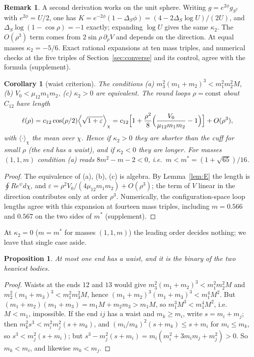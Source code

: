 \documentclass[11pt]{article}
\newtheorem{proposition}[theorem]{Proposition}
\newtheorem{corollary}[theorem]{Corollary}
\theoremstyle{definition}
\newtheorem{remark}[theorem]{Remark}
\begin{document}
\begin{remark}
A second derivation works on the unit sphere. Writing $g=e^{2\phi}g_{S^2}$ with $e^{2\phi}=U/2$, one has
$K=e^{-2\phi}(1-\Delta_S\phi)=(4-2\Delta_S\log U)/(2U)$, and $\Delta_S\log(1-\cos\rho)=-1$ exactly; expanding $\log U$ gives
the same $\kappa_2$. The $O(\rho^3)$ term comes from $2\sin\rho\,\partial_\rho V$ and depends on the direction. At equal
masses $\kappa_2=-5/6$. Exact rational expansions at ten mass triples, and numerical checks at the five triples of
Section~\ref{sec:converse} and its control, agree with the formula (supplement).
\end{remark}

\begin{corollary}[waist criterion]\label{cor:waist}
The conditions (a) $m_3^2(m_1+m_2)^3<m_1^2m_2^2M$, (b) $V_0<\mu_{12}m_1m_2$, (c) $\kappa_2>0$ are equivalent. The round
loops $\rho=\mathrm{const}$ about $C_{12}$ have length
\[
  \ell(\rho)=c_{12}\cos(\rho/2)\Bigl\langle\sqrt{1+\varepsilon}\Bigr\rangle_\chi
  =c_{12}\Bigl[1+\frac{\rho^2}{8}\Bigl(\frac{V_0}{\mu_{12}m_1m_2}-1\Bigr)\Bigr]+O(\rho^3),
\]
with $\langle\cdot\rangle_\chi$ the mean over $\chi$. Hence if $\kappa_2>0$ they are shorter than the cuff for small $\rho$
(the end has a \emph{waist}), and if $\kappa_2<0$ they are longer. For masses $(1,1,m)$ condition (a) reads $8m^2-m-2<0$,
i.e.\ $m<m^*=(1+\sqrt{65})/16$.
\end{corollary}

\begin{proof}
The equivalence of (a), (b), (c) is algebra. By Lemma~\ref{lem:E} the length is $\oint Re^{\psi}d\chi$, and
$\varepsilon=\rho^2V_0/(4\mu_{12}m_1m_2)+O(\rho^3)$; the term of $V$ linear in the direction contributes only at
order $\rho^3$. Numerically, the configuration-space loop lengths agree with this expansion at fourteen mass triples,
including $m=0.566$ and $0.567$ on the two sides of $m^*$ (supplement).
\end{proof}

At $\kappa_2=0$ ($m=m^*$ for masses $(1,1,m)$) the leading order decides nothing; we leave that single case aside.

\begin{proposition}\label{prop:one}
At most one end has a waist, and it is the binary of the two heaviest bodies.
\end{proposition}

\begin{proof}
Waists at the ends $12$ and $13$ would give $m_3^2(m_1+m_2)^3<m_1^2m_2^2M$ and $m_2^2(m_1+m_3)^3<m_1^2m_3^2M$, hence
$(m_1+m_2)^3(m_1+m_3)^3<m_1^4M^2$. But $(m_1+m_2)(m_1+m_3)=m_1M+m_2m_3>m_1M$, so $m_1^3M^3<m_1^4M^2$, i.e.\ $M<m_1$,
impossible. If the end $ij$ has a waist and $m_k\ge m_i$, write $s=m_i+m_j$; then $m_k^2s^3<m_i^2m_j^2(s+m_k)$, and
$(m_i/m_k)^2(s+m_k)\le s+m_i$ for $m_i\le m_k$, so $s^3<m_j^2(s+m_i)$; but $s^3-m_j^2(s+m_i)=m_i(m_i^2+3m_im_j+m_j^2)>0$.
So $m_k<m_i$, and likewise $m_k<m_j$.
\end{proof}
\end{document}
